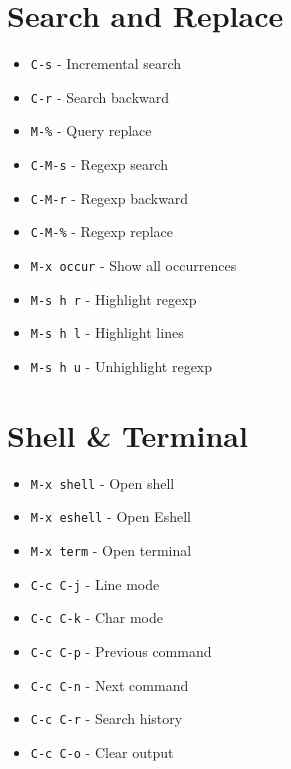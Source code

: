 \documentclass[6pt,landscape]{article}
\newcommand{\key}[1]{\texttt{#1}}
\begin{document}
\begin{multicols*}{5}
\section*{Search and Replace}
\begin{itemize}[leftmargin=*,itemsep=0pt,parsep=0pt,topsep=0pt]
\item \key{C-s} - Incremental search
\item \key{C-r} - Search backward
\item \key{M-\%} - Query replace
\item \key{C-M-s} - Regexp search
\item \key{C-M-r} - Regexp backward
\item \key{C-M-\%} - Regexp replace
\item \key{M-x occur} - Show all occurrences
\item \key{M-s h r} - Highlight regexp
\item \key{M-s h l} - Highlight lines
\item \key{M-s h u} - Unhighlight regexp
\end{itemize}

\section*{Shell \& Terminal}
\begin{itemize}[leftmargin=*,itemsep=0pt,parsep=0pt,topsep=0pt]
\item \key{M-x shell} - Open shell
\item \key{M-x eshell} - Open Eshell
\item \key{M-x term} - Open terminal
\item \key{C-c C-j} - Line mode
\item \key{C-c C-k} - Char mode
\item \key{C-c C-p} - Previous command
\item \key{C-c C-n} - Next command
\item \key{C-c C-r} - Search history
\item \key{C-c C-o} - Clear output
\end{itemize}


\end{multicols*}
\end{document}

